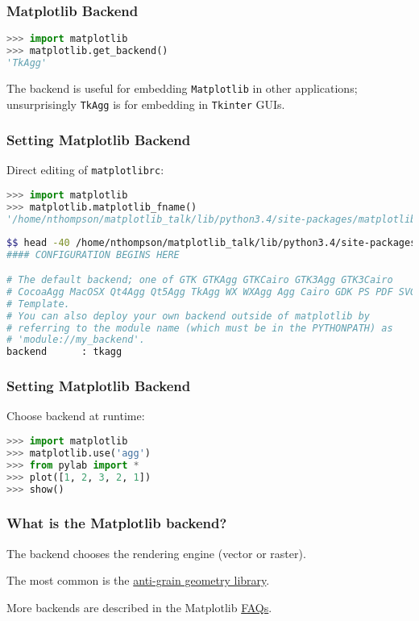 \documentclass{beamer}
\begin{document}
\begin{frame}[fragile]
\frametitle{Matplotlib Backend}
\begin{lstlisting}[language=Python]
>>> import matplotlib
>>> matplotlib.get_backend()
'TkAgg'
\end{lstlisting}
The backend is useful for embedding \texttt{Matplotlib} in other applications; unsurprisingly \texttt{TkAgg} is for embedding in \texttt{Tkinter} GUIs.

\end{frame}

\begin{frame}[fragile]
\frametitle{Setting Matplotlib Backend}
Direct editing of \texttt{matplotlibrc}:
\begin{lstlisting}[language=Python]
>>> import matplotlib
>>> matplotlib.matplotlib_fname()
'/home/nthompson/matplotlib_talk/lib/python3.4/site-packages/matplotlib/mpl-data/matplotlibrc'
\end{lstlisting}
\begin{lstlisting}[language=bash]
$$ head -40 /home/nthompson/matplotlib_talk/lib/python3.4/site-packages/matplotlib/mpl-data/matplotlibrc
#### CONFIGURATION BEGINS HERE

# The default backend; one of GTK GTKAgg GTKCairo GTK3Agg GTK3Cairo
# CocoaAgg MacOSX Qt4Agg Qt5Agg TkAgg WX WXAgg Agg Cairo GDK PS PDF SVG
# Template.
# You can also deploy your own backend outside of matplotlib by
# referring to the module name (which must be in the PYTHONPATH) as
# 'module://my_backend'.
backend      : tkagg
\end{lstlisting}
\end{frame}

\begin{frame}[fragile]
\frametitle{Setting Matplotlib Backend}
Choose backend at runtime:
\begin{lstlisting}[language=Python]
>>> import matplotlib
>>> matplotlib.use('agg')
>>> from pylab import *
>>> plot([1, 2, 3, 2, 1])
>>> show()
\end{lstlisting}
\end{frame}

\begin{frame}
\frametitle{What is the Matplotlib backend?}
The backend chooses the rendering engine (vector or raster).

The most common is the \href{http://agg.sourceforge.net/antigrain.com/index.html}{anti-grain geometry library}.

More backends are described in the Matplotlib \href{http://matplotlib.org/faq/usage_faq.html}{FAQs}.

\end{frame}
\end{document}
